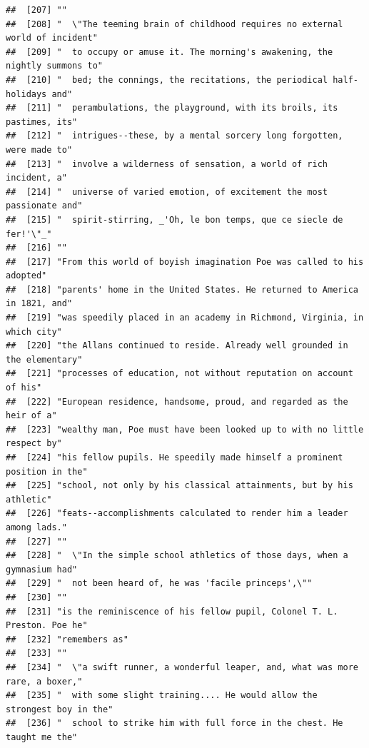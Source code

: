 \documentclass{article}\usepackage[]{graphicx}\usepackage[]{color}
\makeatletter
\newenvironment{kframe}{%
 \def\at@end@of@kframe{}%
 \ifinner\ifhmode%
  \def\at@end@of@kframe{\end{minipage}}%
  \begin{minipage}{\columnwidth}%
 \fi\fi%
 \def\FrameCommand##1{\hskip\@totalleftmargin \hskip-\fboxsep
 \colorbox{shadecolor}{##1}\hskip-\fboxsep
     \hskip-\linewidth \hskip-\@totalleftmargin \hskip\columnwidth}%
 \MakeFramed {\advance\hsize-\width
   \@totalleftmargin\z@ \linewidth\hsize
   \@setminipage}}%
 {\par\unskip\endMakeFramed%
 \at@end@of@kframe}
\newenvironment{knitrout}{}{} %
\makeatother
\begin{document}
\begin{knitrout}
\begin{kframe}
\begin{verbatim}
##  [207] ""                                                                            
##  [208] "  \"The teeming brain of childhood requires no external world of incident"   
##  [209] "  to occupy or amuse it. The morning's awakening, the nightly summons to"    
##  [210] "  bed; the connings, the recitations, the periodical half-holidays and"      
##  [211] "  perambulations, the playground, with its broils, its pastimes, its"        
##  [212] "  intrigues--these, by a mental sorcery long forgotten, were made to"        
##  [213] "  involve a wilderness of sensation, a world of rich incident, a"            
##  [214] "  universe of varied emotion, of excitement the most passionate and"         
##  [215] "  spirit-stirring, _'Oh, le bon temps, que ce siecle de fer!'\"_"            
##  [216] ""                                                                            
##  [217] "From this world of boyish imagination Poe was called to his adopted"         
##  [218] "parents' home in the United States. He returned to America in 1821, and"     
##  [219] "was speedily placed in an academy in Richmond, Virginia, in which city"      
##  [220] "the Allans continued to reside. Already well grounded in the elementary"     
##  [221] "processes of education, not without reputation on account of his"            
##  [222] "European residence, handsome, proud, and regarded as the heir of a"          
##  [223] "wealthy man, Poe must have been looked up to with no little respect by"      
##  [224] "his fellow pupils. He speedily made himself a prominent position in the"     
##  [225] "school, not only by his classical attainments, but by his athletic"          
##  [226] "feats--accomplishments calculated to render him a leader among lads."        
##  [227] ""                                                                            
##  [228] "  \"In the simple school athletics of those days, when a gymnasium had"      
##  [229] "  not been heard of, he was 'facile princeps',\""                            
##  [230] ""                                                                            
##  [231] "is the reminiscence of his fellow pupil, Colonel T. L. Preston. Poe he"      
##  [232] "remembers as"                                                                
##  [233] ""                                                                            
##  [234] "  \"a swift runner, a wonderful leaper, and, what was more rare, a boxer,"   
##  [235] "  with some slight training.... He would allow the strongest boy in the"     
##  [236] "  school to strike him with full force in the chest. He taught me the"       

\end{verbatim}
\end{kframe}
\end{knitrout}
\end{document}
